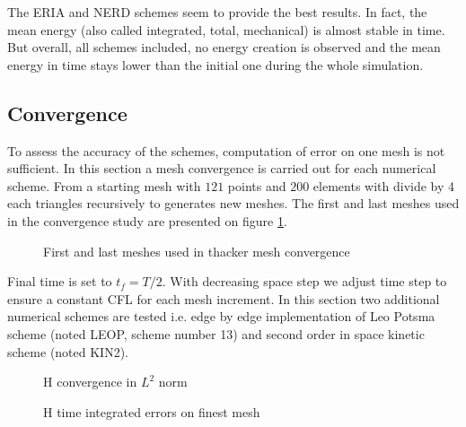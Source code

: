 The ERIA and NERD schemes seem to provide the best results.
In fact, the mean energy (also called integrated, total, mechanical) is almost stable in time.
But overall, all schemes included, no energy creation is observed 
and the mean energy in time stays lower than the initial one during the whole simulation.

\subsection{Convergence}

To assess the accuracy of the schemes, computation of error on one mesh is not sufficient.
In this section a mesh convergence is carried out for each numerical scheme. From a starting mesh
with $121$ points and $200$ elements with divide by 4 each triangles recursively to generates new meshes.
The first and last meshes used in the convergence study are presented on figure \ref{t2d:cone:meshes}. 

\begin{figure}[h!]
\begin{minipage}[t]{0.5\textwidth}
 \centering
\end{minipage}%
\begin{minipage}[t]{0.5\textwidth}
 \centering
\end{minipage}
 \caption{First and last meshes used in thacker mesh convergence}
 \label{t2d:cone:meshes}
\end{figure}

Final time is set to $t_f=T/2$.
With decreasing space step we adjust time step to ensure a constant CFL for each mesh increment.
In this section two additional numerical schemes are tested 
i.e. edge by edge implementation of Leo Potsma scheme (noted LEOP, scheme number 13)
and second order in space kinetic scheme (noted KIN2).

\begin{figure}[H]
\centering
  \caption{H convergence in $L^2$ norm}
\label{fig:thacker:ErrNumH_convergence}
\end{figure}

\begin{figure}[H]
\centering
  \caption{H time integrated errors on finest mesh}
\label{fig:thacker:ErrNumH_convergence_mesh3}
\end{figure}

